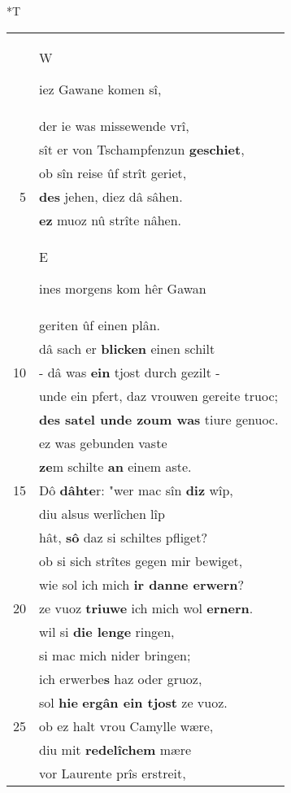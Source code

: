 \documentclass[8pt,a4paper,notitlepage]{article}
\begin{document}
\begin{table}[ht]
\begin{minipage}[t]{0.5\linewidth}
\small
\begin{center}*T
\end{center}
\begin{tabular}{rl}
 & \begin{large}W\end{large}iez Gawane komen sî,\\ 
 & der ie was missewende vrî,\\ 
 & sît er von Tschampfenzun \textbf{geschiet},\\ 
 & ob sîn reise ûf strît geriet,\\ 
5 & \textbf{des} jehen, diez dâ sâhen.\\ 
 & \textbf{ez} muoz nû strîte nâhen.\\ 
 & \begin{large}E\end{large}ines morgens kom hêr Gawan\\ 
 & geriten ûf einen plân.\\ 
 & dâ sach er \textbf{blicken} einen schilt\\ 
10 & - dâ was \textbf{ein} tjost durch gezilt -\\ 
 & unde ein pfert, daz vrouwen gereite truoc;\\ 
 & \textbf{des satel unde zoum was} tiure genuoc.\\ 
 & ez was gebunden vaste\\ 
 & \textbf{ze}m schilte \textbf{an} einem aste.\\ 
15 & Dô \textbf{dâhte}r: "wer mac sîn \textbf{diz} wîp,\\ 
 & diu alsus werlîchen lîp\\ 
 & hât, \textbf{sô} daz si schiltes pfliget?\\ 
 & ob si sich strîtes gegen mir bewiget,\\ 
 & wie sol ich mich \textbf{ir danne erwern}?\\ 
20 & ze vuoz \textbf{triuwe} ich mich wol \textbf{ernern}.\\ 
 & wil si \textbf{die lenge} ringen,\\ 
 & si mac mich nider bringen;\\ 
 & ich erwerbe\textbf{s} haz oder gruoz,\\ 
 & sol \textbf{hie} \textbf{ergân ein tjost} ze vuoz.\\ 
25 & ob ez halt vrou Camylle wære,\\ 
 & diu mit \textbf{redelîchem} mære\\ 
 & vor Laurente prîs erstreit,\\ 

\end{tabular}
\end{minipage}
\end{table}
\end{document}
